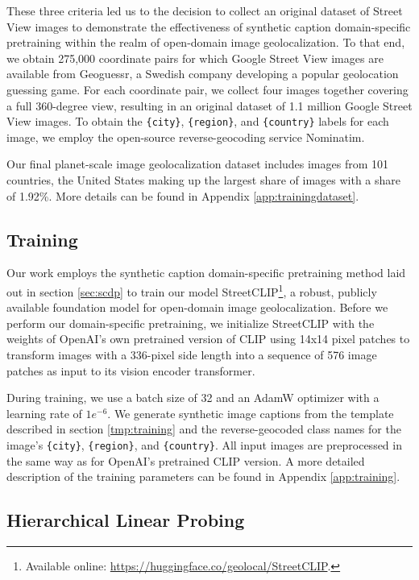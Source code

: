 \documentclass{article}
\renewcommand{\cite}[1]{\citep{#1}}
\begin{document}
These three criteria led us to the decision to collect an original dataset of Street View images to demonstrate the effectiveness of synthetic caption domain-specific pretraining within the realm of open-domain image geolocalization. To that end, we obtain 275,000 coordinate pairs for which Google Street View images are available from Geoguessr, a Swedish company developing a popular geolocation guessing game. For each coordinate pair, we collect four images together covering a full 360-degree view, resulting in an original dataset of 1.1 million Google Street View images. To obtain the \texttt{\{city\}}, \texttt{\{region\}}, and \texttt{\{country\}} labels for each image, we employ the open-source reverse-geocoding service Nominatim.

Our final planet-scale image geolocalization dataset includes images from 101 countries, the United States making up the largest share of images with a share of 1.92\%. More details can be found in Appendix \ref{app:trainingdataset}.

\subsection{Training}

Our work employs the synthetic caption domain-specific pretraining method laid out in section \ref{sec:scdp} to train our model StreetCLIP\footnote{Available online: \href{https://huggingface.co/geolocal/StreetCLIP}{https://huggingface.co/geolocal/StreetCLIP}.}, a robust, publicly available foundation model for open-domain image geolocalization. Before we perform our domain-specific pretraining, we initialize StreetCLIP with the weights of OpenAI's own pretrained version of CLIP \cite{clip_large} using 14x14 pixel patches to transform images with a 336-pixel side length into a sequence of 576 image patches as input to its vision encoder transformer.

During training, we use a batch size of 32 and an AdamW optimizer \cite{loshchilov_2017} with a learning rate of $1e^{-6}$. We generate synthetic image captions from the template described in section \ref{tmp:training} and the reverse-geocoded class names for the image's \texttt{\{city\}}, \texttt{\{region\}}, and \texttt{\{country\}}. All input images are preprocessed in the same way as for OpenAI's pretrained CLIP version. A more detailed description of the training parameters can be found in Appendix \ref{app:training}.

\subsection{Hierarchical Linear Probing}
\label{sec:probing}
\end{document}

